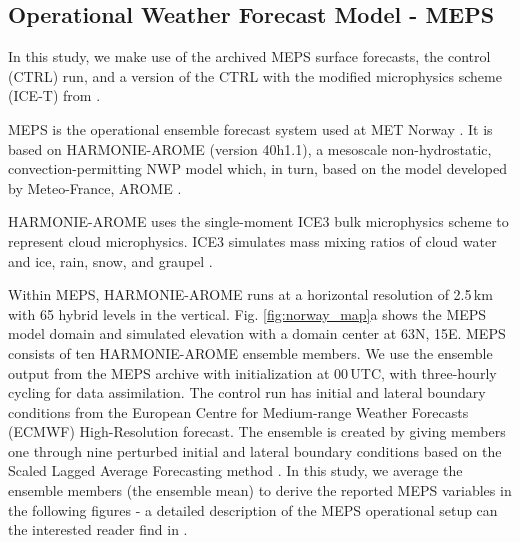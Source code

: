 \documentclass{ametsocV5}
\begin{document}
	\subsection{Operational Weather Forecast Model - MEPS}\label{sec:methodology:MEPS}
		In this study, we make use of the archived MEPS surface forecasts, the control (CTRL) run, and a version of the CTRL with the modified microphysics scheme (ICE-T) from \citet{engdahl_effects_2020}.

		MEPS is the operational ensemble forecast system used at MET Norway \citep{frogner_convection-permitting_2019}. It is based on HARMONIE-AROME (version 40h1.1), a mesoscale non-hydrostatic, convection-permitting NWP model \citep{the_metcoop_team_metcoop_2017} which, in turn, based on the model developed by Meteo-France, AROME \citep{seity_arome-france_2010,bengtsson_harmoniearome_2017}.

		HARMONIE-AROME uses the single-moment ICE3 bulk microphysics scheme \citep{caniaux_numerical_1994,pinty_mixed-phased_1998} to represent cloud microphysics. ICE3 simulates mass mixing ratios of cloud water and ice, rain, snow, and graupel \citep{cohard_comprehensive_2000, cohard_comprehensive_2000-1}.

		Within MEPS, HARMONIE-AROME runs at a horizontal resolution of 2.5\,km with 65 hybrid levels in the vertical. Fig. \ref{fig:norway_map}a shows the MEPS model domain and simulated elevation with a domain center at 63\textdegree N, 15\textdegree E. MEPS consists of ten HARMONIE-AROME ensemble members. We use the ensemble output from the MEPS archive with initialization at 00\,UTC, with three-hourly cycling for data assimilation. The control run has initial and lateral boundary conditions from the European Centre for Medium-range Weather Forecasts (ECMWF) High-Resolution forecast. The ensemble is created by giving members one through nine perturbed initial and lateral boundary conditions based on the Scaled Lagged Average Forecasting method \citep{koltzow_metcoop_2017}. In this study, we average the ensemble members (the ensemble mean) to derive the reported MEPS variables in the following figures - a detailed description of the MEPS operational setup can the interested reader find in \citet{frogner_convection-permitting_2019}. 
\end{document}
